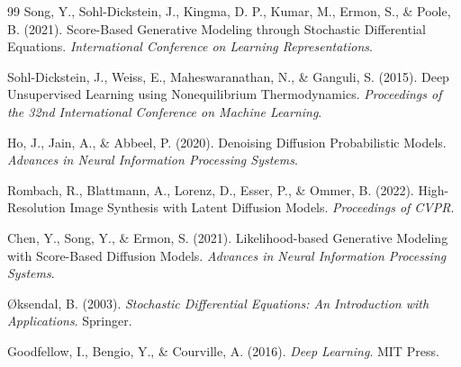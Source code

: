 \begin{thebibliography}{99}
Song, Y., Sohl-Dickstein, J., Kingma, D. P., Kumar, M., Ermon, S., \& Poole, B. (2021). Score-Based Generative Modeling through Stochastic Differential Equations. \textit{International Conference on Learning Representations}.

Sohl-Dickstein, J., Weiss, E., Maheswaranathan, N., \& Ganguli, S. (2015). Deep Unsupervised Learning using Nonequilibrium Thermodynamics. \textit{Proceedings of the 32nd International Conference on Machine Learning}.

Ho, J., Jain, A., \& Abbeel, P. (2020). Denoising Diffusion Probabilistic Models. \textit{Advances in Neural Information Processing Systems}.

Rombach, R., Blattmann, A., Lorenz, D., Esser, P., \& Ommer, B. (2022). High-Resolution Image Synthesis with Latent Diffusion Models. \textit{Proceedings of CVPR}.

Chen, Y., Song, Y., \& Ermon, S. (2021). Likelihood-based Generative Modeling with Score-Based Diffusion Models. \textit{Advances in Neural Information Processing Systems}.

Øksendal, B. (2003). \textit{Stochastic Differential Equations: An Introduction with Applications}. Springer.

Goodfellow, I., Bengio, Y., \& Courville, A. (2016). \textit{Deep Learning}. MIT Press.
\end{thebibliography}